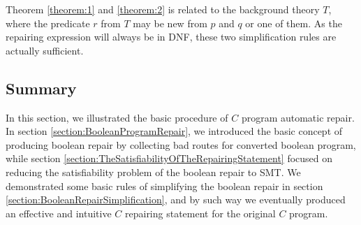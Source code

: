 Theorem \ref{theorem:1} and \ref{theorem:2} is related to the background theory $T$, where the predicate $r$ from $T$ may be new from $p$ and $q$ or one of them. As the repairing expression will always be in DNF, these two simplification rules are actually sufficient.

\subsection{Summary}
In this section, we illustrated the basic procedure of $C$ program automatic repair. In section \ref{section:BooleanProgramRepair}, we introduced the basic concept of producing boolean repair by collecting bad routes for converted boolean program, while section \ref{section:TheSatisfiabilityOfTheRepairingStatement} focused on reducing the satisfiability problem of the boolean repair to SMT. We demonstrated some basic rules of simplifying the boolean repair in section \ref{section:BooleanRepairSimplification}, and by such way we eventually produced an effective and intuitive $C$ repairing statement for the original $C$ program.
